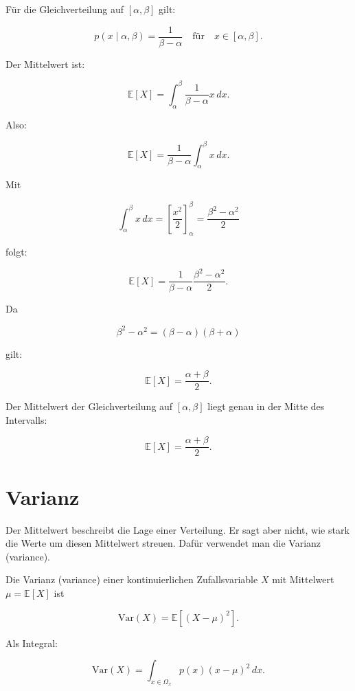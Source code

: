 \begin{examplebox}
Für die Gleichverteilung auf \([\alpha,\beta]\) gilt:

\[
    p(x \mid \alpha,\beta)
    =
    \frac{1}{\beta-\alpha}
    \quad
    \text{für}
    \quad
    x \in [\alpha,\beta].
\]

Der Mittelwert ist:

\[
    \mathbb{E}[X]
    =
    \int_{\alpha}^{\beta}
    \frac{1}{\beta-\alpha}x\,dx.
\]

Also:

\[
    \mathbb{E}[X]
    =
    \frac{1}{\beta-\alpha}
    \int_{\alpha}^{\beta} x\,dx.
\]

Mit

\[
    \int_{\alpha}^{\beta} x\,dx
    =
    \left[
        \frac{x^2}{2}
    \right]_{\alpha}^{\beta}
    =
    \frac{\beta^2-\alpha^2}{2}
\]

folgt:

\[
    \mathbb{E}[X]
    =
    \frac{1}{\beta-\alpha}
    \frac{\beta^2-\alpha^2}{2}.
\]

Da

\[
    \beta^2-\alpha^2
    =
    (\beta-\alpha)(\beta+\alpha)
\]

gilt:

\[
    \mathbb{E}[X]
    =
    \frac{\alpha+\beta}{2}.
\]
\end{examplebox}

\begin{conceptbox}
Der Mittelwert der Gleichverteilung auf \([\alpha,\beta]\) liegt genau in der Mitte des Intervalls:

\[
    \mathbb{E}[X]
    =
    \frac{\alpha+\beta}{2}.
\]
\end{conceptbox}

\section{Varianz}

Der Mittelwert beschreibt die Lage einer Verteilung.
Er sagt aber nicht, wie stark die Werte um diesen Mittelwert streuen.
Dafür verwendet man die Varianz (variance).

\begin{definitionbox}
Die Varianz (variance) einer kontinuierlichen Zufallsvariable \(X\) mit Mittelwert \(\mu = \mathbb{E}[X]\) ist

\[
    \mathrm{Var}(X)
    =
    \mathbb{E}\left[(X-\mu)^2\right].
\]

Als Integral:

\[
    \mathrm{Var}(X)
    =
    \int_{x \in \Omega_x}
    p(x)(x-\mu)^2\,dx.
\]
\end{definitionbox}

